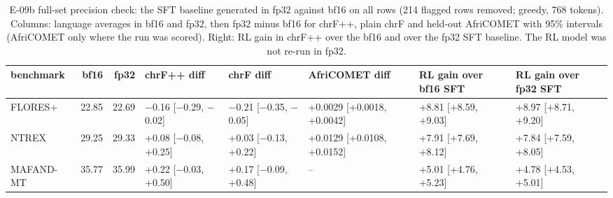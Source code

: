 \begin{table}[htbp]
\centering\footnotesize\setlength{\tabcolsep}{3pt}
\caption{E-09b full-set precision check: the SFT baseline generated in fp32 against bf16 on all rows (214 flagged rows removed; greedy, 768 tokens). Columns: language averages in bf16 and fp32, then fp32 minus bf16 for chrF++, plain chrF and held-out AfriCOMET with 95\% intervals (AfriCOMET only where the run was scored). Right: RL gain in chrF++ over the bf16 and over the fp32 SFT baseline. The RL model was not re-run in fp32.}\label{tab:e09b-full}\begin{adjustbox}{max width=\linewidth}\begin{tabular}{@{}lrrlllll@{}}
\toprule
benchmark & bf16 & fp32 & chrF++ diff & chrF diff & AfriCOMET diff & RL gain over bf16 SFT & RL gain over fp32 SFT\\
\midrule
FLORES+ & 22.85 & 22.69 & $-$0.16 [$-$0.29, $-$0.02] & $-$0.21 [$-$0.35, $-$0.05] & +0.0029 [+0.0018, +0.0042] & +8.81 [+8.59, +9.03] & +8.97 [+8.71, +9.20] \\
NTREX & 29.25 & 29.33 & +0.08 [$-$0.08, +0.25] & +0.03 [$-$0.13, +0.22] & +0.0129 [+0.0108, +0.0152] & +7.91 [+7.69, +8.12] & +7.84 [+7.59, +8.05] \\
MAFAND-MT & 35.77 & 35.99 & +0.22 [$-$0.03, +0.50] & +0.17 [$-$0.09, +0.48] & -- & +5.01 [+4.76, +5.23] & +4.78 [+4.53, +5.01] \\
\bottomrule
\end{tabular}\end{adjustbox}
\end{table}
